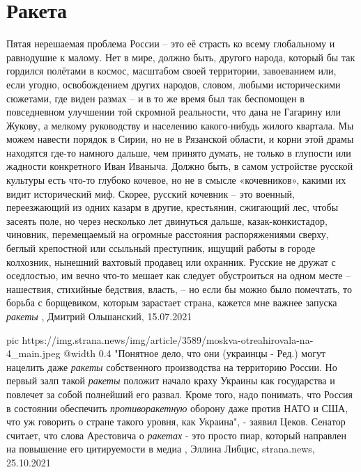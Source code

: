  
 
 
 
 
\chapter{Ракета}
\label{sec:slova.raketa}

Пятая нерешаемая проблема России – это её страсть ко всему глобальному и равнодушие к малому.
Нет в мире, должно быть, другого народа, который бы так гордился полётами в
космос, масштабом своей территории, завоеванием или, если угодно, освобождением
других народов, словом, любыми историческими сюжетами, где виден размах – и в
то же время был так беспомощен в повседневном улучшении той скромной
реальности, что дана не Гагарину или Жукову, а мелкому руководству и населению
какого-нибудь жилого квартала. Мы можем навести порядок в Сирии, но не в
Рязанской области, и корни этой драмы находятся где-то намного дальше, чем
принято думать, не только в глупости или жадности конкретного Иван Иваныча.
Должно быть, в самом устройстве русской культуры есть что-то глубоко кочевое,
но не в смысле «кочевников», какими их видит исторический миф. Скорее, русский
кочевник – это военный, переезжающий из одних казарм в другие, крестьянин,
сжигающий лес, чтобы засеять поле, но через несколько лет двинуться дальше,
казак-конкистадор, чиновник, перемещаемый на огромные расстояния распоряжениями
сверху, беглый крепостной или ссыльный преступник, ищущий работы в городе
колхозник, нынешний вахтовый продавец или охранник. Русские не дружат с
оседлостью, им вечно что-то мешает как следует обустроиться на одном месте –
нашествия, стихийные бедствия, власть, – но если бы можно было помечтать, то
борьба с борщевиком, которым зарастает страна, кажется мне важнее запуска
\emph{ракеты}
, Дмитрий Ольшанский, 15.07.2021

\ifcmt
  pic https://img.strana.news/img/article/3589/moskva-otreahirovala-na-4_main.jpeg
  @width 0.4
\fi
"Понятное дело, что они (украинцы - Ред.) могут нацелить даже \emph{ракеты}
собственного производства на территорию России. Но первый залп такой \emph{ракеты}
положит начало краху Украины как государства и повлечет за собой полнейший его
развал. Кроме того, надо понимать, что Россия в состоянии обеспечить
\emph{противоракетную} оборону даже против НАТО и США, что уж говорить о стране такого
уровня, как Украина", - заявил Цеков.  Сенатор считает, что слова Арестовича о
\emph{ракетах} - это просто пиар, который направлен на повышение его цитируемости в
медиа
, Эллина Либцис, strana.news, 25.10.2021
